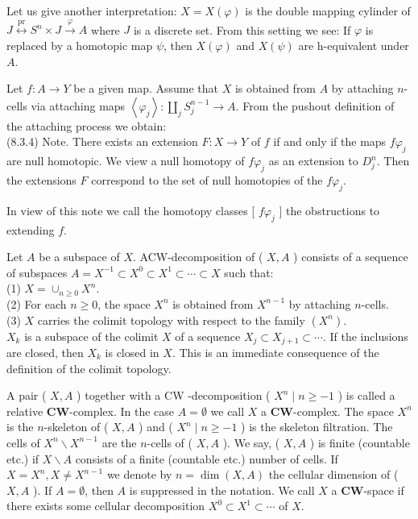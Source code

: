 \documentclass[10pt, letterpaper]{article}
\begin{document}
Let us give another interpretation: $X=X(\varphi)$ is the double mapping cylinder of $J \stackrel{\mathrm{pr}}{\longleftrightarrow} S^{n} \times J \xrightarrow{\varphi} A$ where $J$ is a discrete set. From this setting we see: If $\varphi$ is replaced by a homotopic map $\psi$, then $X(\varphi)$ and $X(\psi)$ are h-equivalent under $A$.

Let $f: A \rightarrow Y$ be a given map. Assume that $X$ is obtained from $A$ by attaching $n$-cells via attaching maps $\left\langle\varphi_{j}\right\rangle: \coprod_{j} S_{j}^{n-1} \rightarrow A$. From the pushout definition of the attaching process we obtain:\\
(8.3.4) Note. There exists an extension $F: X \rightarrow Y$ of $f$ if and only if the maps $f \varphi_{j}$ are null homotopic. We view a null homotopy of $f \varphi_{j}$ as an extension to $D_{j}^{n}$. Then the extensions $F$ correspond to the set of null homotopies of the $f \varphi_{j}$.

In view of this note we call the homotopy classes [ $f \varphi_{j}$ ] the obstructions to extending $f$.

Let $A$ be a subspace of $X$. ACW-decomposition of ( $X, A$ ) consists of a sequence of subspaces $A=X^{-1} \subset X^{0} \subset X^{1} \subset \cdots \subset X$ such that:\\
(1) $X=\cup_{n \geq 0} X^{n}$.\\
(2) For each $n \geq 0$, the space $X^{n}$ is obtained from $X^{n-1}$ by attaching $n$-cells.\\
(3) $X$ carries the colimit topology with respect to the family $\left(X^{n}\right)$.\\
$X_{k}$ is a subspace of the colimit $X$ of a sequence $X_{j} \subset X_{j+1} \subset \cdots$. If the inclusions are closed, then $X_{k}$ is closed in $X$. This is an immediate consequence of the definition of the colimit topology.

A pair ( $X, A$ ) together with a CW -decomposition ( $X^{n} \mid n \geq-1$ ) is called a relative $\boldsymbol{C} \boldsymbol{W}$-complex. In the case $A=\emptyset$ we call $X$ a $\boldsymbol{C} \boldsymbol{W}$-complex. The space $X^{n}$ is the $n$-skeleton of ( $X, A$ ) and ( $X^{n} \mid n \geq-1$ ) is the skeleton filtration. The cells of $X^{n} \backslash X^{n-1}$ are the $n$-cells of ( $X, A$ ). We say, ( $X, A$ ) is finite (countable etc.) if $X \backslash A$ consists of a finite (countable etc.) number of cells. If $X=X^{n}, X \neq X^{n-1}$ we denote by $n=\operatorname{dim}(X, A)$ the cellular dimension of ( $X, A$ ). If $A=\emptyset$, then $A$ is suppressed in the notation. We call $X$ a $\boldsymbol{C W}$-space if there exists some cellular decomposition $X^{0} \subset X^{1} \subset \cdots$ of $X$.
\end{document}
